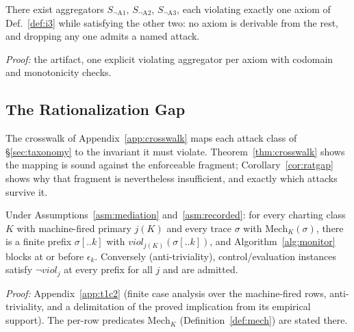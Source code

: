 \begin{proposition}
\label{prop:indep}
There exist aggregators $S_{\neg\mathrm{A1}}$, $S_{\neg\mathrm{A2}}$,
$S_{\neg\mathrm{A3}}$, each violating exactly one axiom of
Def.~\ref{def:i3} while satisfying the other two: no axiom is
derivable from the rest, and dropping any one admits a named attack.
\end{proposition}
\noindent\emph{Proof:} the artifact, one explicit violating aggregator
per axiom with codomain and monotonicity checks.

\subsection{The Rationalization Gap}
\label{sec:guarantees}
The crosswalk of Appendix~\ref{app:crosswalk} maps each attack class of
\S\ref{sec:taxonomy} to the invariant it must violate.
Theorem~\ref{thm:crosswalk} shows the mapping is sound against the
enforceable fragment; Corollary~\ref{cor:ratgap} shows why that
fragment is nevertheless insufficient, and exactly which attacks
survive it.

\begin{theorem}
\label{thm:crosswalk}
Under Assumptions~\ref{asm:mediation} and~\ref{asm:recorded}: for
every charting class $K$ with machine-fired primary $j(K)$ and every
trace $\sigma$ with $\mathrm{Mech}_K(\sigma)$, there is a finite prefix
$\sigma[..k]$ with $\mathit{viol}_{j(K)}(\sigma[..k])$, and
Algorithm~\ref{alg:monitor} blocks at or before $\epsilon_k$. Conversely
(anti-triviality), control/evaluation instances satisfy $\neg
\mathit{viol}_j$ at every prefix for all $j$ and are admitted.
\end{theorem}
\noindent\emph{Proof:} Appendix~\ref{app:t1c2} (finite case analysis
over the machine-fired rows, anti-triviality, and a delimitation of the
proved implication from its empirical support). The per-row predicates
$\mathrm{Mech}_K$ (Definition~\ref{def:mech}) are stated there.

